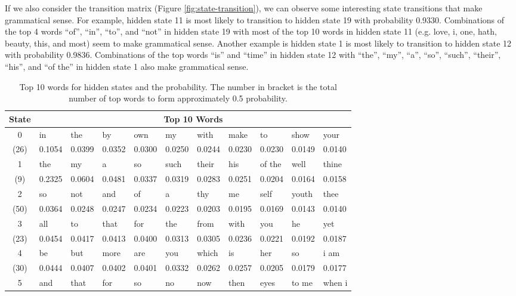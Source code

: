 If we also consider the transition matrix (Figure \ref{fig:state-transition}), we can observe some interesting state transitions that make grammatical sense. For example, hidden state 11 is most likely to transition to hidden state 19 with probability 0.9330. Combinations of the top 4 words ``of'', ``in'', ``to'', and ``not'' in hidden state 19 with most of the top 10 words in hidden state 11 (e.g. love, i, one, hath, beauty, this, and most) seem to make grammatical sense. Another example is hidden state 1 is most likely to transition to hidden state 12 with probability 0.9836. Combinations of the top words ``is'' and ``time'' in hidden state 12 with ``the'', ``my'', ``a'', ``so'', ``such'', ``their'', ``his'', and ``of the'' in hidden state 1 also make grammatical sense.


\begin{table}[H]
	\centering
	\caption{Top 10 words for hidden states and the probability. The number in bracket is the total number of top words to form approximately 0.5 probability.}\label{tab:top-10-words}
	\begin{tabular}{c||l|l|l|l|l|l|l|l|l|l}
		\hline
		State & \multicolumn{10}{c}{Top 10 Words}\\ \hline
		0 & in & the & by & own & my & with & make & to & show & your \\
		(26) & 0.1054 & 0.0399 & 0.0352 & 0.0300 & 0.0250 & 0.0244 & 0.0230 & 0.0230 & 0.0149 & 0.0140 \\ \hline
		1 & the & my & a & so & such & their & his & of the & well & thine \\
		(9) & 0.2325 & 0.0604 & 0.0481 & 0.0337 & 0.0319 & 0.0283 & 0.0251 & 0.0204 & 0.0164 & 0.0158 \\ \hline
		2 & so & not & and & of & a & thy & me & self & youth & thee \\
		(50) & 0.0364 & 0.0248 & 0.0247 & 0.0234 & 0.0223 & 0.0203 & 0.0195 & 0.0169 & 0.0143 & 0.0140 \\ \hline
		3 & all & to & that & for & the & from & with & you & he & yet \\
		(23) & 0.0454 & 0.0417 & 0.0413 & 0.0400 & 0.0313 & 0.0305 & 0.0236 & 0.0221 & 0.0192 & 0.0187 \\ \hline
		4 & be & but & more & are & you & which & is & her & so & i am \\
		(30) & 0.0444 & 0.0407 & 0.0402 & 0.0401 & 0.0332 & 0.0262 & 0.0257 & 0.0205 & 0.0179 & 0.0177 \\ \hline
		5 & and & that & for & so & no & now & then & eyes & to me & when i \\

\end{tabular}
\end{table}

